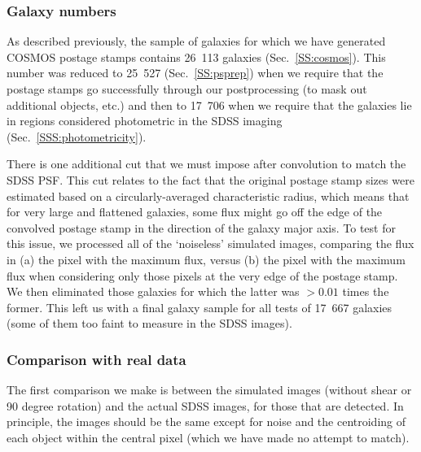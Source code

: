 \documentclass[twocolumn,useAMS,usenatbib]{mn2e}
\begin{document}

\subsubsection{Galaxy numbers}

As described previously, the sample of galaxies for which we have
generated COSMOS postage stamps contains 26~113 galaxies
(Sec.~\ref{SS:cosmos}).  This number was reduced to 25~527
(Sec.~\ref{SS:psprep}) when we require that the postage stamps go
successfully through our postprocessing (to mask out additional
objects, etc.) and then to 17~706 when we require that the galaxies
lie in regions considered photometric in the SDSS imaging
(Sec.~\ref{SSS:photometricity}).

There is one additional cut that we must impose after convolution to
match the SDSS PSF. This cut relates to the fact that the original
postage stamp sizes were estimated based on a circularly-averaged
characteristic radius, which means that for very large and flattened
galaxies, some flux might go off the edge of the convolved postage
stamp in the direction of the galaxy major axis.  To test for this
issue, we processed all of the `noiseless' simulated images,
comparing the flux in (a) the pixel with the maximum flux, versus (b)
the pixel with the maximum flux when considering only those pixels at
the very edge of the postage stamp. We then eliminated those galaxies
for which the latter was $>0.01$ times the former.  This left us with
a final galaxy sample for all tests of 17~667 galaxies (some of them
too faint to measure in the SDSS images).

\subsubsection{Comparison with real data}

The first comparison we make is between the simulated images (without
shear or 90 degree rotation) and the actual SDSS images, for those
that are detected.  In principle, the images should be the same except
for noise and the centroiding of each object within the central pixel (which
we have made no attempt to match).
\end{document}
